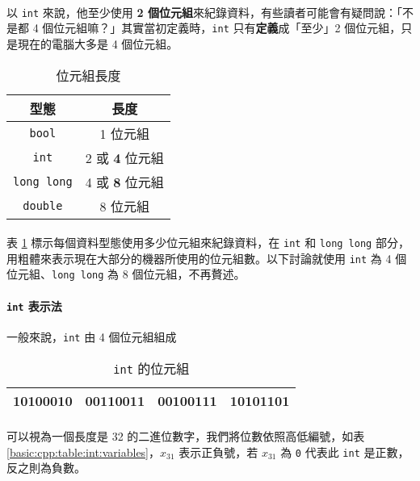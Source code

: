 \documentclass[12pt,a4paper,oneside]{article}
\begin{document}
\begin{CJK}{UTF8}{bkai}
\paragraph{}以 \lstinline!int! 來說，他至少使用 \textbf{2 個位元組}來紀錄資料，有些讀者可能會有疑問說：「不是都 4 個位元組嘛？」其實當初定義時，\lstinline!int! 只有\textbf{定義}成「至少」2 個位元組，只是現在的電腦大多是 4 個位元組。

\begin{table}[h!]
\centering
\begin{tabular}{|c|c|}
\hline
型態 & 長度\\
\hline
\hline
\lstinline!bool!      & 1 位元組\\
\hline
\lstinline!int!       & 2 或 \textbf{4} 位元組\\
\hline
\lstinline!long long! & 4 或 \textbf{8} 位元組\\
\hline
\lstinline!double!    & 8 位元組\\
\hline
\end{tabular}
\caption{位元組長度}
\label{basic:cpp:table:byte:length}
\end{table}

\paragraph{}表 \ref{basic:cpp:table:byte:length} 標示每個資料型態使用多少位元組來紀錄資料，在 \lstinline!int! 和 \lstinline!long long! 部分，用粗體來表示現在大部分的機器所使用的位元組數。以下討論就使用 \lstinline!int! 為 4 個位元組、\lstinline!long long! 為 8 個位元組，不再贅述。

\paragraph{\lstinline!int! 表示法}一般來說，\lstinline!int! 由 4 個位元組組成

\begin{table}[h!]
\centering
\begin{tabular}{|c|c|c|c|}
\hline
10100010 & 00110011 & 00100111 & 10101101\\
\hline
\end{tabular}
\caption{\lstinline!int! 的位元組}
\label{basic:cpp:table:int}
\end{table}

\paragraph{}可以視為一個長度是 32 的二進位數字，我們將位數依照高低編號，如表 \ref{basic:cpp:table:int:variables}，$x_{31}$ 表示正負號，若 $x_{31}$ 為 \lstinline!0! 代表此 \lstinline!int! 是正數，反之則為負數。


\end{CJK}
\end{document}
